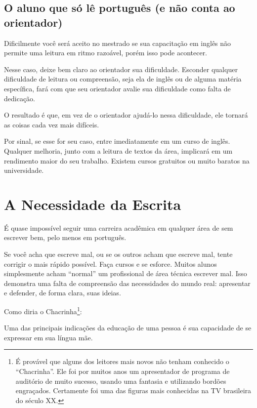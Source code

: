 \subsection{O aluno que só lê português (e não conta ao orientador)}


Dificilmente você será aceito no mestrado se sua capacitação em inglês não permite uma leitura em ritmo razoável, porém isso pode acontecer.


Nesse caso, deixe bem claro ao orientador sua dificuldade. Esconder qualquer dificuldade de leitura ou compreensão, seja ela de inglês ou de alguma matéria específica, fará com que seu orientador avalie sua dificuldade como falta de dedicação.


O resultado é que, em vez de o orientador ajudá-lo nessa dificuldade, ele tornará as coisas cada vez mais difíceis.


Por sinal, se esse for seu caso, entre imediatamente em um curso de inglês. Qualquer melhoria, junto com a leitura de textos da área, implicará em um rendimento maior do seu trabalho. Existem cursos gratuitos ou muito baratos na universidade.

\section{A Necessidade da Escrita}


É quase impossível seguir uma carreira acadêmica em qualquer área de sem escrever bem, pelo menos em português. 


Se você acha que escreve mal, ou se os outros acham que escreve mal, tente corrigir o mais rápido possível. Faça cursos e se esforce. Muitos alunos simplesmente acham “normal” um profissional de área técnica escrever mal. Isso demonstra uma falta de compreensão das necessidades do mundo real: apresentar e defender, de forma clara, suas ideias. 


Como diria o Chacrinha\footnote{É provável que alguns dos leitores mais novos não tenham conhecido o “Chacrinha”. Ele foi por muitos anos um apresentador de programa de auditório de muito sucesso, usando uma fantasia e utilizando bordões engraçados. Certamente foi uma das figuras mais conhecidas na TV brasileira do século XX.}: 




Uma das principais indicações da educação de uma pessoa é sua capacidade de se expressar em sua língua mãe.


